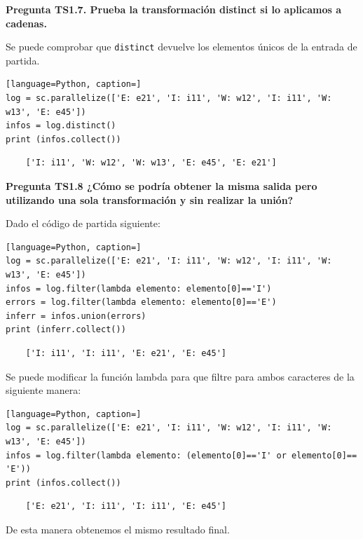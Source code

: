 \documentclass[10pt,swedish, openany]{book}
\begin{document}
\vspace{0.8em}

\textbf{Pregunta TS1.7. Prueba la transformación distinct si lo aplicamos a cadenas.}

Se puede comprobar que \texttt{distinct} devuelve los elementos únicos de la entrada de partida.

\begin{lstlisting}[language=Python, caption=]
log = sc.parallelize(['E: e21', 'I: i11', 'W: w12', 'I: i11', 'W: w13', 'E: e45'])
infos = log.distinct()
print (infos.collect())
\end{lstlisting}
\begin{verbatim}
    ['I: i11', 'W: w12', 'W: w13', 'E: e45', 'E: e21']
\end{verbatim}
\vspace{0.8em}

\textbf{Pregunta TS1.8 ¿Cómo se podría obtener la misma salida pero utilizando una sola transformación y sin realizar la unión?}

Dado el código de partida siguiente:

\begin{lstlisting}[language=Python, caption=]
log = sc.parallelize(['E: e21', 'I: i11', 'W: w12', 'I: i11', 'W: w13', 'E: e45'])
infos = log.filter(lambda elemento: elemento[0]=='I')
errors = log.filter(lambda elemento: elemento[0]=='E')
inferr = infos.union(errors)
print (inferr.collect())
\end{lstlisting}
\begin{verbatim}
    ['I: i11', 'I: i11', 'E: e21', 'E: e45']
\end{verbatim}

Se puede modificar la función lambda para que filtre para ambos caracteres de la siguiente manera:

\begin{lstlisting}[language=Python, caption=]
log = sc.parallelize(['E: e21', 'I: i11', 'W: w12', 'I: i11', 'W: w13', 'E: e45'])
infos = log.filter(lambda elemento: (elemento[0]=='I' or elemento[0]== 'E'))
print (infos.collect())
\end{lstlisting}
\begin{verbatim}
    ['E: e21', 'I: i11', 'I: i11', 'E: e45']
\end{verbatim}

De esta manera obtenemos el mismo resultado final.

\vspace{0.8em}
\end{document}
